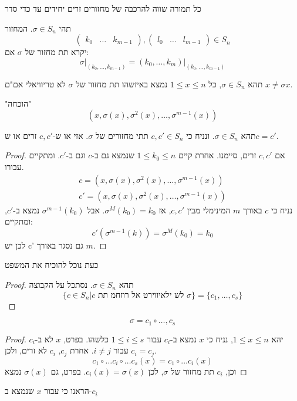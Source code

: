 \documentclass{tstextbook}
\begin{document}
\begin{proposition}
כל תמורה שווה להרכבה של מחזורים זרים יחידים עד כדי סדר

\end{proposition}
\begin{definition}[תת מחזור]
תהי \(\sigma \in S_{n}\). המחזור 
$$\begin{pmatrix} k_{0}& \dots & k_{m-1}\end{pmatrix},\begin{pmatrix} l_{0}& \dots & l_{m-1}\end{pmatrix}\in S_{n}$$
 יקרא תת מחזור של \(\sigma\) אם:
$$\sigma\big|_{(k_{0},\dots,k_{m-1})} = (k_{0},\dots,k_{m})\big|_{(k_{0},\dots,k_{m-1})}$$

\end{definition}
\begin{lemma}
תהא \(\sigma \in S_{n}\), כל  \(1\leq x\leq n\) נמצא באיזשהו תת מחזור של \(\sigma\) לא טריוויאלי אם"ם \(x\neq \sigma x\).

\end{lemma}
"הוכחה"
$$(x,\sigma(x),\sigma^2(x),\dots,\sigma^{m-1}(x))$$

\begin{lemma}
תהא \(\sigma \in S_{n}\). ונניח כי \(c,c' \in S_{n}\) תתי מחזורים של \(\sigma\). אזי או ש-\(c,c'\) זרים או ש\(c=c'\).

\end{lemma}
\begin{proof}
אם \(c,c'\) זרים, סיימנו.
אחרת קיים \(1\leq k_{0}\leq n\) שנמצא גם ב-\(c\) וגם ב-\(c'\). ומתקיים עבורו.
$$\begin{gather}c=(x,\sigma(x),\sigma^2(x),\dots,\sigma^{m-1}(x)) \\c'=(x,\sigma(x),\sigma^2(x),\dots,\sigma^{m-1}(x))
\end{gather}$$
נניח כי \(c\) באורך \(m\) המינימלי מבין \(c,c'\), אז \(\sigma^M(k_{0})=k_{0}\). אבל \(\sigma^{m-1}(k_{0})\) נמצא ב-\(c'\), ומתקיים:
$$c'(\sigma^{m-1}(k))=\sigma^M(k_{0})=k_{0}$$
לכן יש c' גם נסגר באורך \(m\).

\end{proof}
כעת נוכל להוכיח את המשפט

\begin{proof}
תהא \(\sigma \in S_{n}\). נסתכל על הקבוצה
$$\{ c \in S_{n} \big|c\text{ לש ילאיווירט אל רוזחמ תת }\sigma \}=\{ c_{1},\dots,c_{s} \}$$

\end{proof}
\begin{proposition}
$$\sigma=c_{1}\circ\dots,c_{s}$$

\end{proposition}
\begin{proof}
יהא \(1\leq x\leq n\), נניח כי \(x\) נמצא ב-\(c_{i}\) עבור \(1\leq i\leq s\) כלשהו. 
בפרט, \(x\) לא ב-\(c_{i}\) עבור \(i\neq j\). אחרת \(c_j\), \(c_{i}\) לא זרים, ולכן \(c_{i}=c_{j}\).
$$c_{1}\circ \dots c_{i}\circ \dots c_{s}(x)=c_{1}\circ \dots c_{i}(x)$$
וכן, \(c_{i}\) תת מחזור של \(\sigma\), לכן \(c_{i}(x)=\sigma(x)\). בפרט, גם \(\sigma(x)\) נמצא

\end{proof}
הראנו כי עבור \(x\) שנמצא ב-\(c_i\)
\end{document}
